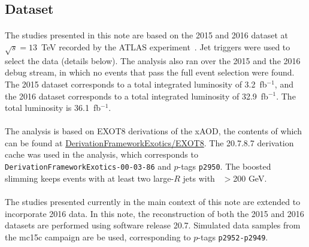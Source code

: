 \subsection{Dataset}

\paragraph{}
The studies presented in this note are based on the 2015 and 2016 dataset at $\sqrt{s}=13$~TeV recorded by the ATLAS experiment~\cite{detPaper}. Jet triggers were used to select the data (details below). The analysis also ran over the 2015 and the 2016 debug stream, in which no events that pass the full event selection were found. The 2015 dataset corresponds to a total integrated luminosity of 3.2\, fb$^{-1}$, and the 2016 dataset corresponds to a total integrated luminosity of 32.9\, fb$^{-1}$. The total luminosity is 36.1\, fb$^{-1}$.

\paragraph{}
The analysis is based on EXOT8 derivations of the xAOD, the contents of which can be found at \href{https://svnweb.cern.ch/trac/atlasoff/browser/PhysicsAnalysis/DerivationFramework/DerivationFrameworkExotics/trunk/share/EXOT8.py}{DerivationFrameworkExotics/EXOT8}. The 20.7.8.7 derivation cache was used in the analysis, which corresponds to \texttt{DerivationFrameworkExotics-00-03-86} and $p$-tags \texttt{p2950}. The boosted slimming keeps events with at least two large-$R$ jets with \pt~$>$200 GeV. 

\paragraph{}
The studies presented currently in the main context of this note are extended to incorporate 2016 data. In this note, the reconstruction of both the 2015 and 2016 datasets are performed using software release 20.7. Simulated data samples from the mc15c campaign are be used, corresponding to $p$-tags \texttt{p2952-p2949}.

